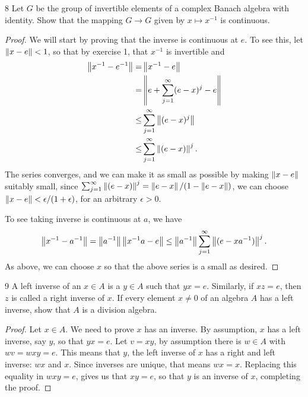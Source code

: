 \begin{exercise}{8}
Let $G$ be the group of invertible elements of a complex Banach algebra with identity.
Show that the mapping $G \to G$ given by $x \mapsto x^{-1}$ is continuous.
\end{exercise}
\begin{proof}
We will start by proving that the inverse is continuous at $e$.
To see this, let $\left\lVert x - e\right\rVert < 1$, so that by exercise 1, that $x^{-1}$ is invertible and 
\begin{align*}
    \left\lVert x^{-1} - e^{-1}\right\rVert 
    =& \left\lVert x^{-1} - e\right\rVert\\
    =& \left\lVert e + \sum_{j=1}^\infty (e - x)^j - e\right\rVert\\
    \leq& \sum_{j=1}^\infty \left\lVert (e - x)^j\right\rVert\\
    \leq& \sum_{j=1}^\infty \left\lVert (e - x)\right\rVert^j.
\end{align*}
The series converges, and we can make it as small as possible by making $\left\lVert x - e\right\rVert$ suitably small, since $\sum_{j=1}^\infty \left\lVert (e - x)\right\rVert^j = \left\lVert e - x\right\rVert/(1- \left\lVert e - x\right\rVert)$, we can choose $\left\lVert x - e\right\rVert < \epsilon / (1 + \epsilon)$, for an arbitrary $\epsilon > 0$.

To see taking inverse is continuous at $a$, we have
\begin{align*}
    \left\lVert x^{-1} - a^{-1}\right\rVert
    = \left\lVert a^{-1}\right\rVert \left\lVert x^{-1} a - e\right\rVert
    \leq \left\lVert a^{-1}\right\rVert \sum_{j=1}^\infty \left\lVert (e - x a^{-1})\right\rVert^j.
\end{align*}
As above, we can choose $x$ so that the above series is a small as desired.
\end{proof} 

\begin{exercise}{9}
A left inverse of an $x \in A$ is a $y \in A$ such that $y x = e$.
Similarly, if $x z = e$, then $z$ is called a right inverse of $x$. If every element $x \neq 0$ of an algebra $A$ has a left inverse, show that $A$ is a division algebra.
\end{exercise}
\begin{proof}
Let $x \in A$.
We need to prove $x$ has an inverse.
By assumption, $x$ has a left inverse, say $y$, so that $y x = e$.
Let $v = x y$, by assumption there is $w \in A$ with $w v = w x y = e$.
This means that $y$, the left inverse of $x$ has a right and left inverse:
$w x$ and $x$.
Since inverses are unique, that means $w x = x$.
Replacing this equality in $w x y = e$, gives us that $x y = e$, so that $y$ is an inverse of $x$, completing the proof.
\end{proof} 

